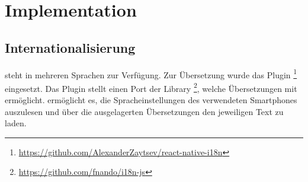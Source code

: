 \chapter{Implementation}
\label{pd-implementation}

\section{Internationalisierung}
\kort{} steht in mehreren Sprachen zur Verfügung.
Zur Übersetzung wurde das Plugin \footnote{\url{https://github.com/AlexanderZaytsev/react-native-i18n}} eingesetzt.
Das Plugin stellt einen  Port der Library \footnote{\url{https://github.com/fnando/i18n-js}}, welche Übersetzungen mit  ermöglicht.\newline
{} ermöglicht es, die Spracheinstellungen des verwendeten Smartphones auszulesen und über die ausgelagerten Übersetzungen den jeweiligen Text zu laden.